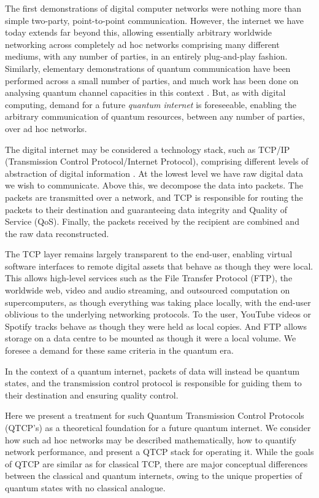 \documentclass[aps,rmp,twocolumn,amsmath,amssymb,nofootinbib,superscriptaddress,longbibliography,floatfix]{revtex4-1}
\begin{document}
The first demonstrations of digital computer networks were nothing more than simple two-party, point-to-point communication. However, the internet we have today extends far beyond this, allowing essentially arbitrary worldwide networking across completely ad hoc networks comprising many different mediums, with any number of parties, in an entirely plug-and-play fashion. Similarly, elementary demonstrations of quantum communication have been performed across a small number of parties, and much work has been done on analysing quantum channel capacities in this context \cite{??? channel_capacity}. But, as with digital computing, demand for a future \emph{quantum internet} is foreseeable, enabling the arbitrary communication of quantum resources, between any number of parties, over ad hoc networks.

The digital internet may be considered a technology stack, such as TCP/IP (Transmission Control Protocol/Internet Protocol), comprising different levels of abstraction of digital information \cite{textbookOnNetworking}. At the lowest level we have raw digital data we wish to communicate. Above this, we decompose the data into packets. The packets are transmitted over a network, and TCP is responsible for routing the packets to their destination and guaranteeing data integrity and Quality of Service ({\sc QoS}). Finally, the packets received by the recipient are combined and the raw data reconstructed.

The TCP layer remains largely transparent to the end-user, enabling virtual software interfaces to remote digital assets that behave as though they were local. This allows high-level services such as the File Transfer Protocol (FTP), the worldwide web, video and audio streaming, and outsourced computation on supercomputers, as though everything was taking place locally, with the end-user oblivious to the underlying networking protocols. To the user, YouTube videos or Spotify tracks behave as though they were held as local copies. And FTP allows storage on a data centre to be mounted as though it were a local volume. We foresee a demand for these same criteria in the quantum era.

In the context of a quantum internet, packets of data will instead be quantum states, and the transmission control protocol is responsible for guiding them to their destination and ensuring quality control.

Here we present a treatment for such Quantum Transmission Control Protocols (QTCP's) as a theoretical foundation for a future quantum internet. We consider how such ad hoc networks may be described mathematically, how to quantify network performance, and present a QTCP stack for operating it. While the goals of QTCP are similar as for classical TCP, there are major conceptual differences between the classical and quantum internets, owing to the unique properties of quantum states with no classical analogue.
\end{document}
